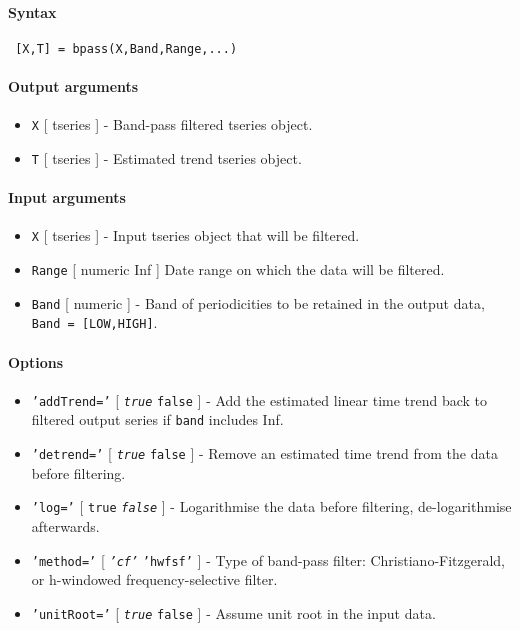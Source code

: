 


	\paragraph{Syntax}
 
 \begin{verbatim}
 [X,T] = bpass(X,Band,Range,...)
 \end{verbatim}
 
 \paragraph{Output arguments}
 
 \begin{itemize}
 \item
   \texttt{X} {[} tseries {]} - Band-pass filtered tseries object.
 \item
   \texttt{T} {[} tseries {]} - Estimated trend tseries object.
 \end{itemize}
 
 \paragraph{Input arguments}
 
 \begin{itemize}
 \item
   \texttt{X} {[} tseries {]} - Input tseries object that will be
   filtered.
 \item
   \texttt{Range} {[} numeric \textbar{} Inf {]} Date range on which the
   data will be filtered.
 \item
   \texttt{Band} {[} numeric {]} - Band of periodicities to be retained
   in the output data, \texttt{Band = {[}LOW,HIGH{]}}.
 \end{itemize}
 
 \paragraph{Options}
 
 \begin{itemize}
 \item
   \texttt{'addTrend='} {[} \emph{\texttt{true}} \textbar{}
   \texttt{false} {]} - Add the estimated linear time trend back to
   filtered output series if \texttt{band} includes Inf.
 \item
   \texttt{'detrend='} {[} \emph{\texttt{true}} \textbar{} \texttt{false}
   {]} - Remove an estimated time trend from the data before filtering.
 \item
   \texttt{'log='} {[} \texttt{true} \textbar{} \emph{\texttt{false}} {]}
   - Logarithmise the data before filtering, de-logarithmise afterwards.
 \item
   \texttt{'method='} {[} \emph{\texttt{'cf'}} \textbar{}
   \texttt{'hwfsf'} {]} - Type of band-pass filter:
   Christiano-Fitzgerald, or h-windowed frequency-selective filter.
 \item
   \texttt{'unitRoot='} {[} \emph{\texttt{true}} \textbar{}
   \texttt{false} {]} - Assume unit root in the input data.
 \end{itemize}
 
